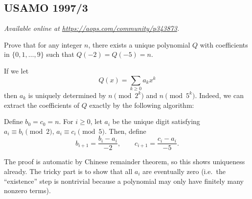 \documentclass[11pt]{scrartcl}
\begin{document}
\subsection{USAMO 1997/3}
\textsl{Available online at \url{https://aops.com/community/p343873}.}
\begin{mdframed}[style=mdpurplebox,frametitle={Problem statement}]
Prove that for any integer $n$,
there exists a unique polynomial $Q$ with coefficients
in $\{0,1,\dots,9\}$ such that $Q(-2) = Q(-5) = n$.
\end{mdframed}
If we let
\[ Q(x) = \sum_{k \ge 0} a_k x^k \]
then $a_k$ is uniquely determined by $n \pmod{2^k}$ and $n \pmod{5^k}$.
Indeed, we can extract the coefficients of $Q$
exactly by the following algorithm:
\begin{itemize}
  \ii Define $b_0 = c_0 = n$.
  \ii For $i \ge 0$, let $a_i$ be the unique digit
  satisfying $a_i \equiv b_i \pmod 2$, $a_i \equiv c_i \pmod 5$.
  Then, define
  \[ b_{i+1} = \frac{b_i - a_i}{-2}, \qquad
    c_{i+1} = \frac{c_i - a_i}{-5}. \]
\end{itemize}
The proof is automatic by Chinese remainder theorem,
so this shows uniqueness already.
The tricky part is to show that all $a_i$ are eventually zero
(i.e.\ the ``existence'' step is nontrivial
because a polynomial may only have finitely many nonzero terms).
\end{document}
